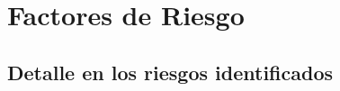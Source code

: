 \section{Factores de Riesgo}
\label{section:riesgos}

\Blindtext[1]

\subsection{Detalle en los riesgos identificados}
\label{subsection:riesgos:detalle}

\Blindtext[1]

